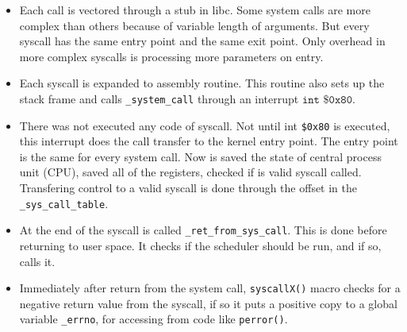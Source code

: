\begin{itemize}
	\item Each call is vectored through a stub in libc. Some system calls are more complex than others because of variable length of arguments. But every syscall has the same entry point and the same exit point. Only overhead in more complex syscalls is processing more parameters on entry.
	\item Each syscall is expanded to assembly routine. This routine also sets up the stack frame and calls \texttt{\_system\_call\(\)} through an interrupt \( \texttt{int \$0x80} \).
	\item There was not executed any code of syscall. Not until int \texttt{\$0x80} is executed, this interrupt does the call transfer to the kernel entry point. The entry point is the same for every system call. Now is saved the state of central process unit (CPU), saved all of the registers, checked if is valid syscall called. Transfering control to a valid syscall is done through the offset in the \texttt{\_sys\_call\_table}.
	\item At the end of the syscall is called \texttt{\_ret\_from\_sys\_call\(\)}. This is done before returning to user space. It checks if the scheduler should be run, and if so, calls it.
	\item Immediately after return from the system call, \texttt{syscallX()} macro checks for a negative return value from the syscall, if so it puts a positive copy to a global variable \texttt{\_errno}, for accessing from code like \texttt{perror()}.



\end{itemize}

